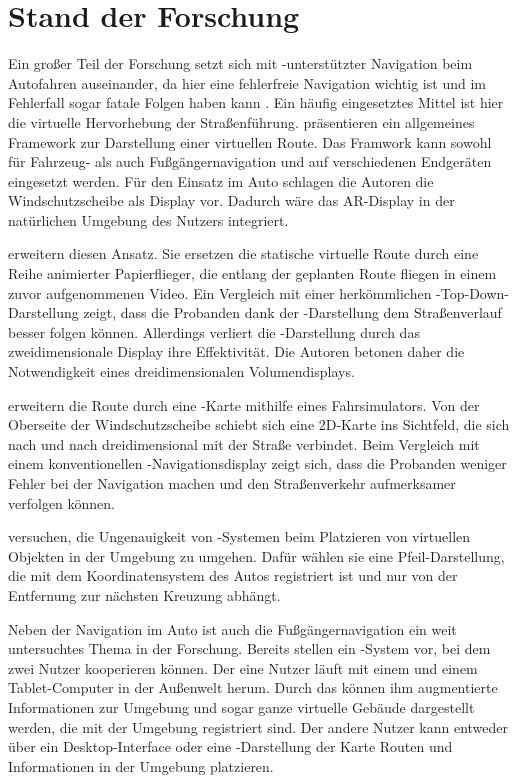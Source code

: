 \chapter{Stand der Forschung}
Ein großer Teil der Forschung setzt sich mit -unterstützter Navigation beim Autofahren auseinander, da hier eine fehlerfreie Navigation wichtig ist und im Fehlerfall sogar fatale Folgen haben kann \parencite{Lin2017}.
Ein häufig eingesetztes Mittel ist hier die virtuelle Hervorhebung der Straßenführung.
\textcite{Narzt2006} präsentieren ein allgemeines Framework zur Darstellung einer virtuellen Route.
Das Framwork kann sowohl für Fahrzeug- als auch Fußgängernavigation und auf verschiedenen Endgeräten eingesetzt werden.
Für den Einsatz im Auto schlagen die Autoren die Windschutzscheibe als Display vor.
Dadurch wäre das AR-Display in der natürlichen Umgebung des Nutzers integriert.

\textcite{Bark2014} erweitern diesen Ansatz.
Sie ersetzen die statische virtuelle Route durch eine Reihe animierter Papierflieger, die entlang der geplanten Route fliegen in einem zuvor aufgenommenen Video.
Ein Vergleich mit einer herkömmlichen -Top-Down-Darstellung zeigt, dass die Probanden dank der -Darstellung dem Straßenverlauf besser folgen können.
Allerdings verliert die -Darstellung durch das zweidimensionale Display ihre Effektivität.
Die Autoren betonen daher die Notwendigkeit eines dreidimensionalen Volumendisplays.

\textcite{Kim2009} erweitern die Route durch eine -Karte mithilfe eines Fahrsimulators.
Von der Oberseite der Windschutzscheibe schiebt sich eine 2D-Karte ins Sichtfeld, die sich nach und nach dreidimensional mit der Straße verbindet.
Beim Vergleich mit einem konventionellen -Navigationsdisplay zeigt sich, dass die Probanden weniger Fehler bei der Navigation machen und den Straßenverkehr aufmerksamer verfolgen können.

\cite{Wiesner2017} versuchen, die Ungenauigkeit von -Systemen beim Platzieren von virtuellen Objekten in der Umgebung zu umgehen.
Dafür wählen sie eine Pfeil-Darstellung, die mit dem Koordinatensystem des Autos registriert ist und nur von der Entfernung zur nächsten Kreuzung abhängt.

Neben der Navigation im Auto ist auch die Fußgängernavigation ein weit untersuchtes Thema in der Forschung.
Bereits \textcite{Hoellerer1999} stellen ein -System vor, bei dem zwei Nutzer kooperieren können.
Der eine Nutzer läuft mit einem  und einem Tablet-Computer in der Außenwelt herum.
Durch das  können ihm augmentierte Informationen zur Umgebung und sogar ganze virtuelle Gebäude dargestellt werden, die mit der Umgebung registriert sind.
Der andere Nutzer kann entweder über ein Desktop-Interface oder eine -Darstellung der Karte Routen und Informationen in der Umgebung platzieren.

